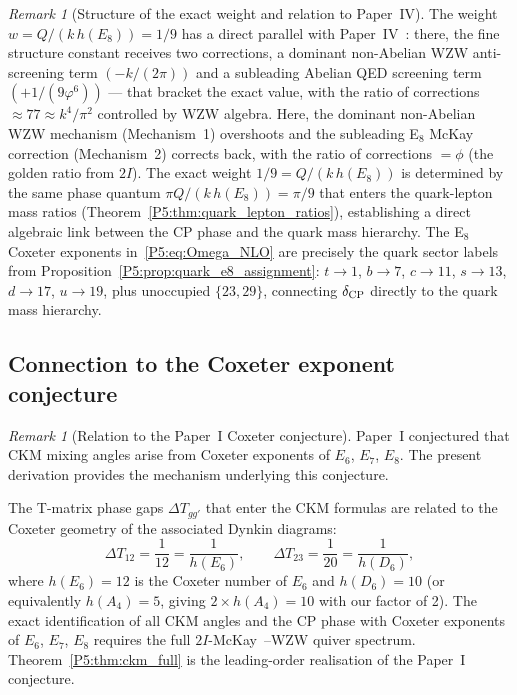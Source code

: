 \documentclass[11pt,a4paper]{article}
\theoremstyle{definition}
\theoremstyle{remark}
\newtheorem{remark}[theorem]{Remark}
\newcommand{\vp}{\varphi}
\begin{document}
\begin{remark}[Structure of the exact weight and relation to Paper~IV]
\label{P5:rem:cp_phase}
The weight $w = Q/(k\,h(E_8)) = 1/9$ has a direct parallel with
Paper~IV~\cite{Paper4}: there, the fine structure constant receives
two corrections,  a dominant non-Abelian WZW anti-screening term
$(-k/(2\pi))$ and a subleading Abelian QED screening term $(+1/(9\vp^6))$
--- that bracket the exact value, with the ratio of corrections
$\approx 77 \approx k^4/\pi^2$ controlled by WZW algebra.
Here, the dominant non-Abelian WZW mechanism (Mechanism~1) overshoots
and the subleading E$_8$ McKay~\cite{McKay1980} correction (Mechanism~2) corrects back,
with the ratio of corrections $= \phi$ (the golden ratio from $2I$).
The exact weight $1/9 = Q/(k\,h(E_8))$ is determined by the same
phase quantum $\pi Q/(k\,h(E_8)) = \pi/9$ that enters the quark-lepton
mass ratios (Theorem~\ref{P5:thm:quark_lepton_ratios}), establishing a
direct algebraic link between the CP phase and the quark mass hierarchy.
The E$_8$ Coxeter exponents in~\eqref{P5:eq:Omega_NLO} are precisely the
quark sector labels from Proposition~\ref{P5:prop:quark_e8_assignment}:
$t\!\to\!1$, $b\!\to\!7$, $c\!\to\!11$, $s\!\to\!13$, $d\!\to\!17$,
$u\!\to\!19$, plus unoccupied $\{23,29\}$, connecting $\delta_{\rm CP}$
directly to the quark mass hierarchy.
\end{remark}

\subsection{Connection to the Coxeter exponent conjecture}

\begin{remark}[Relation to the Paper~I Coxeter conjecture]
\label{P5:rem:coxeter_connection}
Paper~I conjectured that CKM mixing angles arise from Coxeter exponents
of $E_6$, $E_7$, $E_8$.
The present derivation provides the mechanism underlying this conjecture.

The T-matrix phase gaps $\Delta T_{gg'}$ that enter the CKM formulas
are related to the Coxeter geometry of the associated Dynkin diagrams:
\begin{equation}
  \Delta T_{12} = \frac{1}{12} = \frac{1}{h(E_6)},
  \qquad
  \Delta T_{23} = \frac{1}{20} = \frac{1}{h(D_6)},
  \label{P5:eq:coxeter_connection}
\end{equation}
where $h(E_6)=12$ is the Coxeter number of $E_6$ and $h(D_6)=10$ (or
equivalently $h(A_4)=5$, giving $2\times h(A_4)=10$ with our factor of 2).
The exact identification of all CKM angles and the CP phase with
Coxeter exponents of $E_6$, $E_7$, $E_8$ requires the full
$2I$-McKay~\cite{McKay1980}--WZW quiver spectrum.
Theorem~\ref{P5:thm:ckm_full} is the leading-order realisation of the
Paper~I conjecture.
\end{remark}
\end{document}
